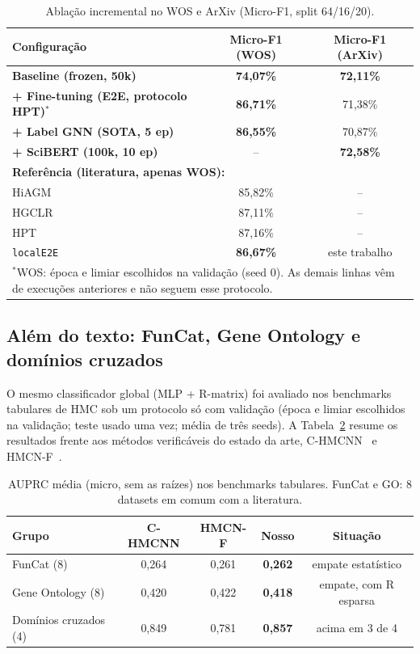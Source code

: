 \documentclass[11pt,a4paper,twoside]{article}
\newcommand{\ours}[1]{\textcolor{ourblue}{\textbf{#1}}}
\begin{document}
\begin{table}[htbp]
\centering
\caption{Ablação incremental no WOS e ArXiv (Micro-F1, split 64/16/20).}
\label{tab:ablation}
\begin{tabular}{lcc}
\toprule
\textbf{Configuração} & \textbf{Micro-F1 (WOS)} & \textbf{Micro-F1 (ArXiv)} \\
\midrule
\ours{Baseline (frozen, 50k)}      & \ours{74,07\%} & \ours{72,11\%} \\
\ours{+ Fine-tuning (E2E, protocolo HPT)}$^\ast$ & \ours{86,71\%} & 71,38\% \\
\ours{+ Label GNN (SOTA, 5 ep)}    & \ours{86,55\%} & 70,87\% \\
\ours{+ SciBERT (100k, 10 ep)}     & --         & \ours{72,58\%} \\
\bottomrule
\midrule
\multicolumn{3}{l}{\small\textbf{Referência (literatura, apenas WOS):}} \\
HiAGM   & 85,82\% & -- \\
HGCLR   & 87,11\% & -- \\
HPT     & 87,16\% & -- \\
\texttt{localE2E} & \ours{86,67\%} & este trabalho \\
\bottomrule
\multicolumn{3}{p{0.9\linewidth}}{\small $^\ast$WOS: época e limiar escolhidos
na validação (seed 0).  As demais linhas vêm de execuções anteriores e não
seguem esse protocolo.} \\
\end{tabular}
\end{table}

\subsection{Além do texto: FunCat, Gene Ontology e domínios cruzados}
\label{sec:tabular}

O mesmo classificador global (MLP + R-matrix) foi avaliado nos benchmarks
tabulares de HMC sob um protocolo só com validação (época e limiar escolhidos
na validação; teste usado uma vez; média de três seeds).  A
Tabela~\ref{tab:tabular} resume os resultados frente aos métodos
verificáveis do estado da arte, C-HMCNN~\cite{giunchiglia2020coherent} e
HMCN-F~\cite{wehrmann2018hmcn}.

\begin{table}[htbp]
\centering
\footnotesize
\caption{AUPRC média (micro, sem as raízes) nos benchmarks tabulares.
         FunCat e GO: 8 datasets em comum com a literatura.}
\label{tab:tabular}
\begin{tabular}{lcccc}
\toprule
\textbf{Grupo} & \textbf{C-HMCNN} & \textbf{HMCN-F} & \textbf{Nosso} & \textbf{Situação} \\
\midrule
FunCat (8)                 & 0,264 & 0,261 & \ours{0,262} & empate estatístico \\
Gene Ontology (8)          & 0,420 & 0,422 & \ours{0,418} & empate, com R esparsa \\
Domínios cruzados (4)      & 0,849 & 0,781 & \ours{0,857} & acima em 3 de 4 \\
\bottomrule
\end{tabular}
\end{table}
\end{document}
